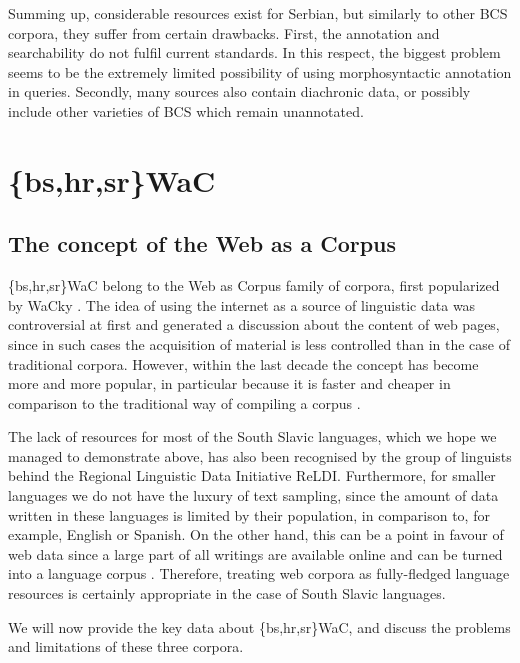 \begin{sloppypar}
Summing up, considerable resources exist for Serbian, but similarly to other BCS corpora, they suffer from certain drawbacks. First, the annotation and searchability do not fulfil current standards. In this respect, the biggest problem seems to be the extremely limited possibility of using morphosyntactic annotation in queries. Secondly, many sources also contain diachronic data, or possibly include other varieties of BCS which remain unannotated.
\end{sloppypar}

\section{\{bs,hr,sr\}WaC}
\label{WAC}
\subsection{The concept of the Web as a Corpus}

\{bs,hr,sr\}WaC \citep{LjubesicKlubicka14, LjubesicErjavec16c, LjubesicErjavec16a, LjubesicErjavec16b} belong to the Web as Corpus family of corpora, first popularized by WaCky \citep{BBFZ09}. The idea of using the internet as a source of linguistic data was controversial at first and generated a discussion about the content of web pages, since in such cases the acquisition of material is  less controlled than in the case of traditional corpora. However, within the last decade the concept has become more and more popular, in particular because it is faster and cheaper in comparison to the traditional way of compiling a corpus \citep[43]{Benko17}. 

The lack of resources for most of the South Slavic languages, which we hope we managed to demonstrate above, has also been recognised by the group of linguists behind the Regional Linguistic Data Initiative ReLDI. Furthermore, for smaller languages we do not have the luxury of text sampling, since the amount of data written in these languages is limited by their population, in comparison to, for example, English or Spanish. On the other hand, this can be a point in favour of web data since a large part of all writings are available online and can be turned into a language corpus \citep{LjubesicErjavec11}. Therefore, treating web corpora as fully-fledged language resources is certainly appropriate in the case of South Slavic languages.

We will now provide the key data about \{bs,hr,sr\}WaC, and discuss the problems and limitations of these three corpora.

